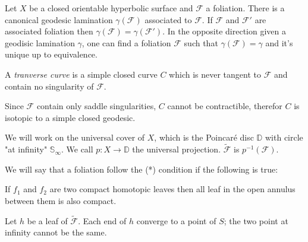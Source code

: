 \begin{thm}
Let $X$ be a closed orientable hyperbolic surface and $\mathcal{F}$ a foliation. There is a canonical geodesic lamination $\gamma(\mathcal{F})$ associated to $\mathcal{F}$. If $\mathcal{F}$ and $\mathcal{F}'$ are associated foliation then $\gamma(\mathcal{F})= \gamma(\mathcal{F}')$. In the opposite direction given a geodisic lamination $\gamma$, one can find a foliation $\mathcal{F}$ such that $\gamma(\mathcal{F})=\gamma$ and it's unique up to equivalence.
\end{thm}


\begin{dfnt}
A \emph{tranverse curve} is a simple closed curve $C$ which is never tangent to $\mathcal{F}$ and contain no singularity of $\mathcal{F}$.
\end{dfnt}

\begin{rmq}
Since $\mathcal{F}$ contain only saddle singularities, $C$ cannot be contractible, therefor $C$ is isotopic to a simple closed geodesic.
\end{rmq}

We will work on the universal cover of $X$, which is the Poincaré disc $\mathbb{D}$ with circle "at infinity" $\mathbb{S}_{\infty}$. We call $p:X \to \mathbb{D}$ the universal projection.
$\mathcal{\tilde{F}}$ is $p^{-1}(\mathcal{F})$.

We will say that a foliation follow the (*) condition if the following is true:
\begin{center}
If $f_1$ and $f_2$ are two compact homotopic leaves then all leaf in the open annulus between them  is also compact.
\end{center}

\begin{lem}
Let $h$ be a leaf of $\mathcal{\tilde{F}}$. Each end of $h$ converge to a point of $S$; the two point at infinity cannot be the same.
\end{lem}

